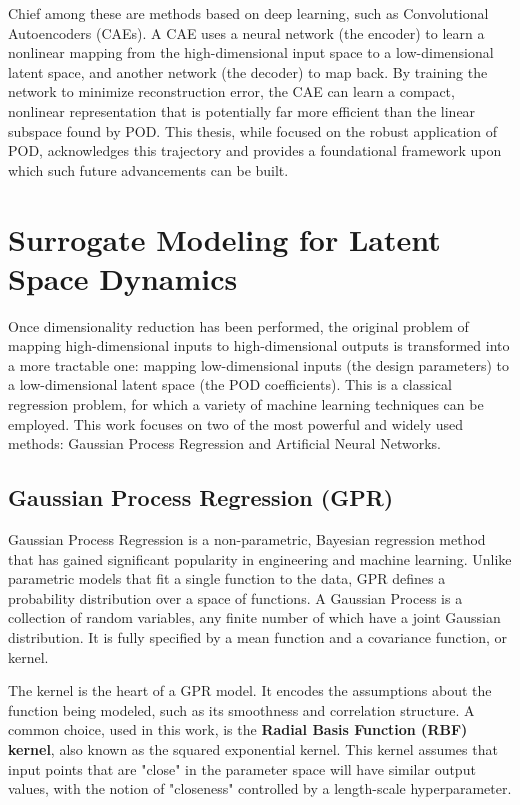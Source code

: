 \documentclass[dsc, EN]{ufabcFHZh}
\begin{document}
{Chief among these are methods based on deep learning, such as Convolutional Autoencoders (CAEs). A CAE uses a neural network (the encoder) to learn a nonlinear mapping from the high-dimensional input space to a low-dimensional latent space, and another network (the decoder) to map back. By training the network to minimize reconstruction error, the CAE can learn a compact, nonlinear representation that is potentially far more efficient than the linear subspace found by POD. This thesis, while focused on the robust application of POD, acknowledges this trajectory and provides a foundational framework upon which such future advancements can be built. 


\section{Surrogate Modeling for Latent Space Dynamics}

Once dimensionality reduction has been performed, the original problem of mapping high-dimensional inputs to high-dimensional outputs is transformed into a more tractable one: mapping low-dimensional inputs (the design parameters) to a low-dimensional latent space (the POD coefficients). This is a classical regression problem, for which a variety of machine learning techniques can be employed. This work focuses on two of the most powerful and widely used methods: Gaussian Process Regression and Artificial Neural Networks.

\subsection{Gaussian Process Regression (GPR)}

Gaussian Process Regression is a non-parametric, Bayesian regression method that has gained significant popularity in engineering and machine learning. Unlike parametric models that fit a single function to the data, GPR defines a probability distribution over a space of functions. A Gaussian Process is a collection of random variables, any finite number of which have a joint Gaussian distribution. It is fully specified by a mean function and a covariance function, or kernel.

The kernel is the heart of a GPR model. It encodes the assumptions about the function being modeled, such as its smoothness and correlation structure. A common choice, used in this work, is the \textbf{Radial Basis Function (RBF) kernel}, also known as the squared exponential kernel. This kernel assumes that input points that are "close" in the parameter space will have similar output values, with the notion of "closeness" controlled by a length-scale hyperparameter.

}
\end{document}
